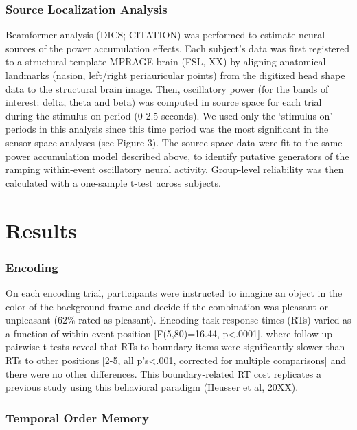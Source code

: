\subsubsection{Source Localization
Analysis}\label{source-localization-analysis}

Beamformer analysis (DICS; CITATION) was performed to estimate neural
sources of the power accumulation effects. Each subject's data was first
registered to a structural template MPRAGE brain (FSL, XX) by aligning
anatomical landmarks (nasion, left/right periauricular points) from the
digitized head shape data to the structural brain image. Then,
oscillatory power (for the bands of interest: delta, theta and beta) was
computed in source space for each trial during the stimulus on period
(0-2.5 seconds). We used only the `stimulus on' periods in this analysis
since this time period was the most significant in the sensor space
analyses (see Figure 3). The source-space data were fit to the same
power accumulation model described above, to identify putative
generators of the ramping within-event oscillatory neural activity.
Group-level reliability was then calculated with a one-sample t-test
across subjects.

\section{Results}\label{results}

\subsubsection{Encoding}\label{encoding-1}

On each encoding trial, participants were instructed to imagine an
object in the color of the background frame and decide if the
combination was pleasant or unpleasant (62\% rated as pleasant).
Encoding task response times (RTs) varied as a function of within-event
position {[}F(5,80)=16.44, p\textless{}.0001{]}, where follow-up
pairwise t-tests reveal that RTs to boundary items were significantly
slower than RTs to other positions {[}2-5, all p's\textless{}.001,
corrected for multiple comparisons{]} and there were no other
differences. This boundary-related RT cost replicates a previous study
using this behavioral paradigm (Heusser et al, 20XX).

\subsubsection{Temporal Order Memory}\label{temporal-order-memory}


